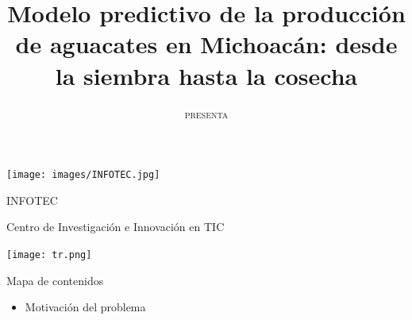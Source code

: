 \documentclass[aspectratio=169]{beamer}
\title[]{\Large\centering
\color{airforceblue}Modelo predictivo de la producción de aguacates en Michoacán: desde la siembra hasta la cosecha}
\author{{\small \textsc{presenta}}\centering{\\Isaac Vázquez Mendoza \\ {\small\textsc{
		bajo la dirección de}}\\ Dra. Magali Arellano Vázquez}}
\institute{}
\begin{document}
	\begin{frame}[noframenumbering]
		
		\begin{minipage}{0.15\textwidth}
			\centering
			\hspace{0.3cm}\vspace{-0.6cm}\texttt{[image: images/INFOTEC.jpg]}
		\end{minipage}%
		\begin{minipage}{0.65\textwidth}
			\centering \vspace{0.5cm}
			\hspace{1cm}INFOTEC
			
			\hspace{1cm}Centro de Investigación e Innovación en TIC
                \hspace{1cm}
   
		\end{minipage}%
		\begin{minipage}{0.2\textwidth}
			\texttt{[image: tr.png]}
                \hspace*{0.5cm}%
		\end{minipage}
		\date{}
		\titlepage
		
		
		
	\end{frame}
%
%


%
%



{
	\begin{frame}{Mapa de contenidos}
		\begin{itemize}
			\color{airforceblue}
			\item Motivación del problema
		\end{itemize}
	\end{frame}
}
\end{document}
